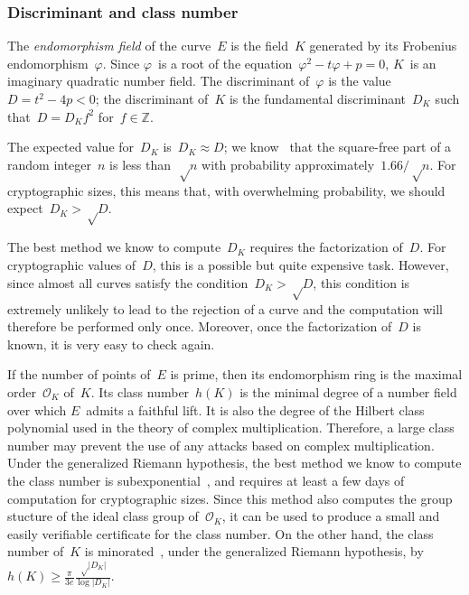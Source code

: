 \documentclass{article}
\let\ro\mathcal
\def\abs#1{\left|#1\right|}
\def\pa#1{\left(#1\right)}
\begin{document}
\subsubsection{Discriminant and class number}
\label{sss:class}

The \emph{endomorphism field} of the curve~$E$
is the field~$K$ generated by its Frobenius endomorphism~$φ$.
Since $φ$~is a root of the equation~$φ^2 - t φ + p = 0$,
$K$~is an imaginary quadratic number field.
The discriminant of~$φ$ is the value~$D = t^2 - 4 p < 0$;
the discriminant of~$K$ is the fundamental discriminant~$D_K$
such that~$D = D_K f^2$ for~$f ∈ ℤ$.

The expected value for~$D_K$ is~$D_K ≈ D$;
we know~\cite{jis2014cdkd} that the square-free part of
a random integer~$n$ is less than~$√n$
with probability approximately~$1.66/√n$.
For cryptographic sizes, this means that,
with overwhelming probability, we should expect~$D_K > √D$.

The best method we know to compute~$D_K$ requires the
factorization of~$D$.
For cryptographic values of~$D$, this is a possible but
quite expensive task.
However, since almost all curves satisfy the condition~$D_K > √D$,
this condition is extremely unlikely to lead to the rejection of a curve
and the computation will therefore be performed only once.
Moreover, once the factorization of~$D$ is known,
it is very easy to check again.

\medbreak

If the number of points of~$E$ is prime,
then its endomorphism ring is the maximal order~$\ro O_K$ of~$K$.
Its class number~$h(K)$ is the minimal degree
of a number field over which $E$~admits a faithful lift.
It is also the degree of the Hilbert class polynomial
used in the theory of complex multiplication.
Therefore, a large class number may prevent the use
of any attacks based on complex multiplication.
Under the generalized Riemann hypothesis,
the best method we know to compute the class number
is subexponential~\cite{chile2009biasse},
and requires at least a few days of computation for cryptographic sizes.
Since this method also computes the group stucture
of the ideal class group of~$\ro O_K$,
it can be used to produce a small and easily verifiable certificate
for the class number.
On the other hand,
the class number of~$K$ is minorated~\cite{cras1990louboutin},
under the generalized Riemann hypothesis,
by~$h(K) ≥ \frac{π}{3e} \frac{√{\abs{D_K}}}{\log \abs{D_K}}$.
\end{document}
